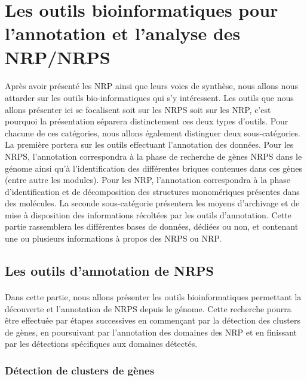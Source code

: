 \documentclass[12pt,french,twoside]{report}
\begin{document}
\section{Les outils bioinformatiques pour l'annotation et l'analyse des NRP/NRPS}

\paragraph{}Après avoir présenté les NRP ainsi que leurs voies de synthèse, nous allons nous attarder sur les outils bio-informatiques qui s'y intéressent.
Les outils que nous allons présenter ici se focalisent soit sur les NRPS soit sur les NRP, c'est pourquoi la présentation séparera distinctement ces deux types d'outils.
Pour chacune de ces catégories, nous allons également distinguer deux sous-catégories.
La première portera sur les outils effectuant l'annotation des données.
Pour les NRPS, l'annotation correspondra à la phase de recherche de gènes NRPS dans le génome ainsi qu'à l'identification des différentes briques contenues dans ces gènes (entre autre les modules).
Pour les NRP, l'annotation correspondra à la phase d'identification et de décomposition des structures monomériques présentes dans des molécules.
La seconde sous-catégorie présentera les moyens d'archivage et de mise à disposition des informations récoltées par les outils d'annotation.
Cette partie rassemblera les différentes bases de données, dédiées ou non, et contenant une ou plusieurs informations à propos des NRPS ou NRP.

\subsection{Les outils d'annotation de NRPS}

\paragraph{}Dans cette partie, nous allons présenter les outils bioinformatiques permettant la découverte et l'annotation de NRPS depuis le génome.
Cette recherche pourra être effectuée par étapes successives en commençant par la détection des clusters de gènes, en poursuivant par l'annotation des domaines des NRP et en finissant par les détections spécifiques aux domaines détectés.

\subsubsection{Détection de clusters de gènes}
\end{document}
